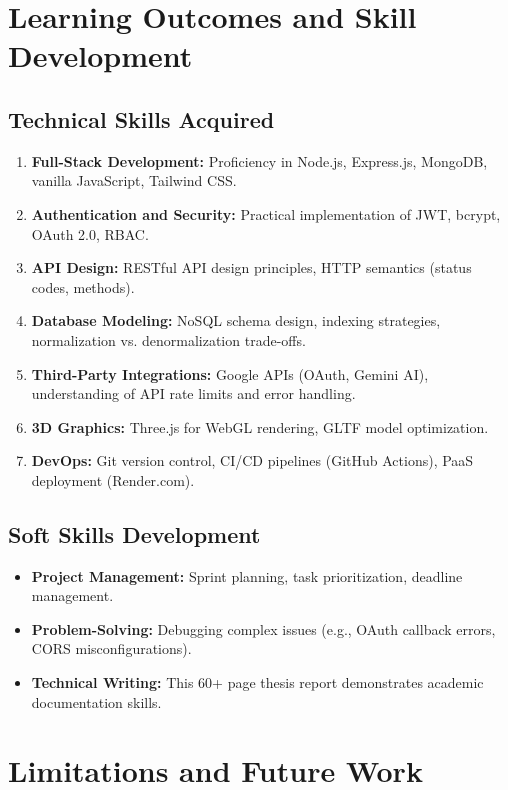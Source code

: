 \section{Learning Outcomes and Skill Development}

\subsection{Technical Skills Acquired}

\begin{enumerate}
    \item \textbf{Full-Stack Development:} Proficiency in Node.js, Express.js, MongoDB, vanilla JavaScript, Tailwind CSS.
    \item \textbf{Authentication and Security:} Practical implementation of JWT, bcrypt, OAuth 2.0, RBAC.
    \item \textbf{API Design:} RESTful API design principles, HTTP semantics (status codes, methods).
    \item \textbf{Database Modeling:} NoSQL schema design, indexing strategies, normalization vs. denormalization trade-offs.
    \item \textbf{Third-Party Integrations:} Google APIs (OAuth, Gemini AI), understanding of API rate limits and error handling.
    \item \textbf{3D Graphics:} Three.js for WebGL rendering, GLTF model optimization.
    \item \textbf{DevOps:} Git version control, CI/CD pipelines (GitHub Actions), PaaS deployment (Render.com).
\end{enumerate}

\subsection{Soft Skills Development}

\begin{itemize}
    \item \textbf{Project Management:} Sprint planning, task prioritization, deadline management.
    \item \textbf{Problem-Solving:} Debugging complex issues (e.g., OAuth callback errors, CORS misconfigurations).
    \item \textbf{Technical Writing:} This 60+ page thesis report demonstrates academic documentation skills.
\end{itemize}

\section{Limitations and Future Work}

